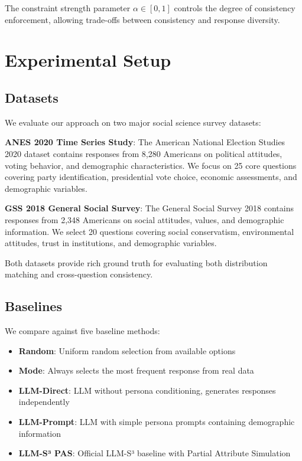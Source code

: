 \documentclass[sigconf, anonymous]{acmart}
\begin{document}
The constraint strength parameter $\alpha \in [0,1]$ controls the degree of consistency enforcement, allowing trade-offs between consistency and response diversity.

\section{Experimental Setup}

\subsection{Datasets}

We evaluate our approach on two major social science survey datasets:

\textbf{ANES 2020 Time Series Study}: The American National Election Studies 2020 dataset contains responses from 8,280 Americans on political attitudes, voting behavior, and demographic characteristics. We focus on 25 core questions covering party identification, presidential vote choice, economic assessments, and demographic variables.

\textbf{GSS 2018 General Social Survey}: The General Social Survey 2018 contains responses from 2,348 Americans on social attitudes, values, and demographic information. We select 20 questions covering social conservatism, environmental attitudes, trust in institutions, and demographic variables.

Both datasets provide rich ground truth for evaluating both distribution matching and cross-question consistency.

\subsection{Baselines}

We compare against five baseline methods:

\begin{itemize}
    \item \textbf{Random}: Uniform random selection from available options
    \item \textbf{Mode}: Always selects the most frequent response from real data
    \item \textbf{LLM-Direct}: LLM without persona conditioning, generates responses independently
    \item \textbf{LLM-Prompt}: LLM with simple persona prompts containing demographic information
    \item \textbf{LLM-S³ PAS}: Official LLM-S³ baseline with Partial Attribute Simulation
\end{itemize}
\end{document}
